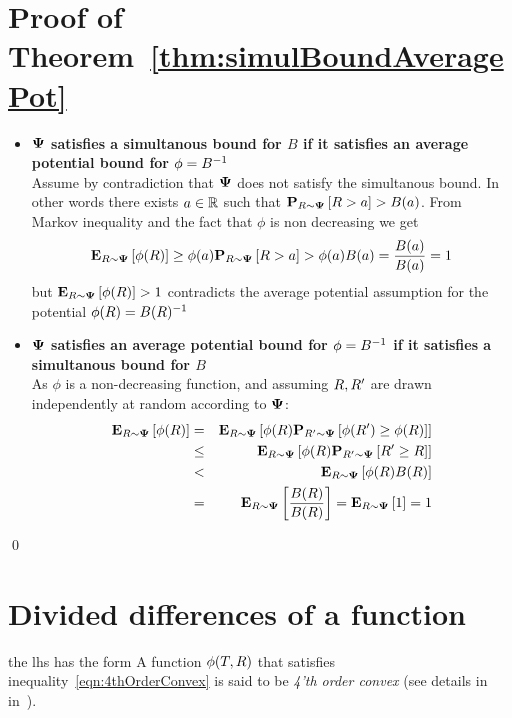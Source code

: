 \documentclass{article}[12pt]
\begin{document}
\section{Proof of Theorem~\ref{thm:simulBoundAveragePot} \label{proof:simulBoundAveragePot}}
\proof
  \begin{itemize}
  \item
  {\bf ${\bf \Psi}$ satisfies a simultanous bound for $B$ if it satisfies an
  average potential bound for $\phi = B^{-1}$}\\
Assume by contradiction that ${\bf \Psi}$ does not satisfy the simultanous bound. In
other words there exists $a \in \mathbb{R}$ such that
${\bf P}_{R \sim {\bf \Psi}}\left[ R > a \right] > B(a)$. From Markov inequality and the fact
that $\phi$ is non decreasing we get
\[
  {\bf E}_{R \sim {\bf \Psi}}\left[ \phi(R) \right] \geq \phi(a) {\bf P}_{R \sim {\bf \Psi}}\left[ R > a \right] >
  \phi(a) B(a) = \frac{B(a)}{B(a)}=1
\]
but $ {\bf E}_{R \sim {\bf \Psi}}\left[ \phi(R) \right] >1$ contradicts the average potential
assumption for the potential $\phi(R) = B(R)^{-1}$
\item
{\bf ${\bf \Psi}$ satisfies an
  average potential bound for $\phi = B^{-1}$ if it satisfies a simultanous bound for $B$}\\
As $\phi$ is a non-decreasing function, and assuming $R,R'$ are drawn
independently at random according to ${\bf \Psi}$:
\begin{eqnarray}
  {\bf E}_{R \sim {\bf \Psi}}\left[ \phi(R) \right] & = & {\bf E}_{R \sim {\bf \Psi}}\left[ \phi(R)
                                  {\bf P}_{R' \sim {\bf \Psi}}\left[ \phi(R') \geq \phi(R) \right] \right] \\
                            & \leq & {\bf E}_{R \sim {\bf \Psi}}\left[ \phi(R)
                                     {\bf P}_{R' \sim {\bf \Psi}}\left[ R' \geq R \right] \right] \\
                            & < & {\bf E}_{R \sim {\bf \Psi}}\left[ \phi(R) B(R) \right] \\
                            & = & {\bf E}_{R \sim {\bf \Psi}}\left[ \frac{B(R)}{B(R)} \right]
                                  = {\bf E}_{R \sim {\bf \Psi}}\left[ 1 \right] = 1
\end{eqnarray}
\end{itemize}
\qed

\section{Divided differences of a function} \label{sec:divdiff}


the lhs has the form
A function $\phi(T,R)$ that satisfies
inequality~\ref{eqn:4thOrderConvex} is said to be {\em 4'th order convex}
(see details in in~\cite{butt2016generalization}).
\end{document}
